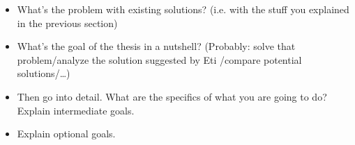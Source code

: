 
\begin{itemize}
  \item What's the problem with existing solutions? (i.e. with the stuff you explained in the previous section)
  \item What's the goal of the thesis in a nutshell? (Probably: solve that problem/analyze the solution suggested by Eti \cite{testref}/compare potential solutions/\dots)
  \item Then go into detail. What are the specifics of what you are going to do? Explain intermediate goals.
  \item Explain optional goals.
\end{itemize}
